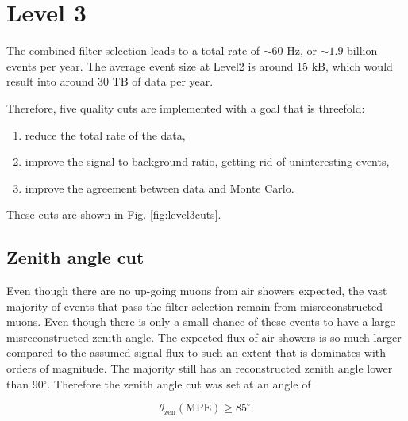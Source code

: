 \section{Level 3}
The combined filter selection leads to a total rate of $\sim60$ Hz, or $\sim1.9$ billion events per year. The average event size at Level2 is around 15 kB, which would result into around 30 TB of data per year.

Therefore, five quality cuts are implemented with a goal that is threefold:
\vspace{2mm}
\begin{enumerate}
\item reduce the total rate of the data,
\item improve the signal to background ratio, getting rid of uninteresting events,
\item improve the agreement between data and Monte Carlo.
\end{enumerate}
\vspace{2mm}
\noindent These cuts are shown in Fig. \ref{fig:level3cuts}.

\subsection{Zenith angle cut}
Even though there are no up-going muons from air showers expected, the vast majority of events that pass the filter selection remain from misreconstructed muons. Even though there is only a small chance of these events to have a large misreconstructed zenith angle. The expected flux of air showers is so much larger compared to the assumed signal flux to such an extent that is dominates with orders of magnitude. The majority still has an reconstructed zenith angle lower than 90$^\circ$. Therefore the zenith angle cut was set at an angle of 

\begin{equation}
\theta_\textrm{zen} (\textrm{MPE}) \geq 85^\circ.
\end{equation}

